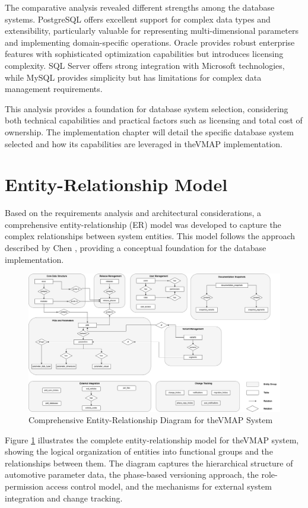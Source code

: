 The comparative analysis revealed different strengths among the database systems. PostgreSQL offers excellent support for complex data types and extensibility, particularly valuable for representing multi-dimensional parameters and implementing domain-specific operations. Oracle provides robust enterprise features with sophisticated optimization capabilities but introduces licensing complexity. SQL Server offers strong integration with Microsoft technologies, while MySQL provides simplicity but has limitations for complex data management requirements.

This analysis provides a foundation for database system selection, considering both technical capabilities and practical factors such as licensing and total cost of ownership. The implementation chapter will detail the specific database system selected and how its capabilities are leveraged in the\ac{VMAP} implementation.
\section{Entity-Relationship Model}
\label{sec:entity-relationship-model}

Based on the requirements analysis and architectural considerations, a comprehensive entity-relationship (ER) model was developed to capture the complex relationships between system entities. This model follows the approach described by Chen \cite{chen1976entity}, providing a conceptual foundation for the database implementation.

\begin{figure}[h]
\centering
\includegraphics[width=1.0\textwidth]{figures/vmap_er_diagram.png}
\caption{Comprehensive Entity-Relationship Diagram for the\ac{VMAP} System}
\label{fig}
\end{figure}
Figure \ref{fig} illustrates the complete entity-relationship model for the\ac{VMAP} system, showing the logical organization of entities into functional groups and the relationships between them. The diagram captures the hierarchical structure of automotive parameter data, the phase-based versioning approach, the role-permission access control model, and the mechanisms for external system integration and change tracking.

